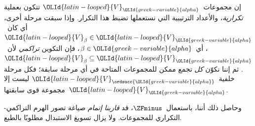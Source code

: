 \documentclass[../../../include/open-logic-section]{subfiles}
\begin{document}
إن مجموعات~$\OLId{latin-looped}{V}_\OLId{greek-variable}{alpha}$ تتكون بعملية \emph{تكرارية}، والأعداد
الترتيبية التي نستعملها تضبط هذا التكرار. وإذا سبقت مرحلة أخرى،
أي كان~$\OLId{latin-looped}{V}_\beta \in \OLId{latin-looped}{V}_\OLId{greek-variable}{alpha}$، أي~$\beta \in \OLId{greek-variable}{alpha}$، فإن التكوين
\emph{تراكمي} لأن~$\OLId{latin-looped}{V}_\beta \subseteq \OLId{latin-looped}{V}_\OLId{greek-variable}{alpha}$. ثم إننا نكوّن
\emph{كل} تجمع ممكن للمجموعات المتاحة في أي مرحلة سابقة؛ فكل مرحلة
خلفية~$\OLId{latin-looped}{V}_{\ordsucc{\OLId{greek-variable}{alpha}}}$ ليست إلا مجموعة قوى سابقتها~$\OLId{latin-looped}{V}_\OLId{greek-variable}{alpha}$.

وحاصل ذلك أننا، باستعمال~$\ZFminus$، قد \emph{قاربنا إتمام} صياغة
تصور الهرم التراكمي-التكراري للمجموعات. ولا يزال تسويغ الاستبدال
مطلوبًا بالطبع.
\end{document}
